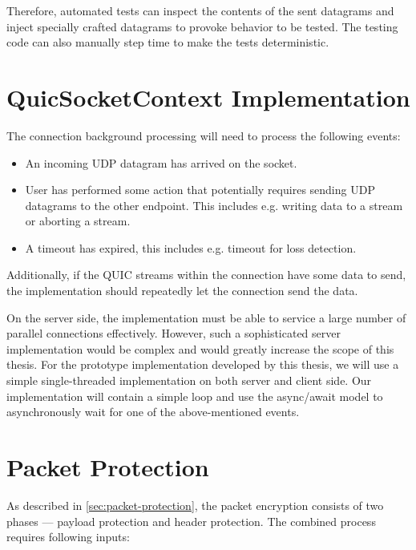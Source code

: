 Therefore, automated tests can inspect the contents of the sent datagrams and inject specially
crafted datagrams to provoke behavior to be tested. The testing code can also manually step time to
make the tests deterministic.

\section{QuicSocketContext Implementation}

The connection background processing will need to process the following events:

\begin{itemize}

  \item An incoming UDP datagram has arrived on the socket.

  \item User has performed some action that potentially requires sending UDP datagrams to the other
    endpoint. This includes e.g. writing data to a stream or aborting a stream.

  \item A timeout has expired, this includes e.g. timeout for loss detection.

\end{itemize}

Additionally, if the QUIC streams within the connection have some data to send, the
\QuicSocketContext{} implementation should repeatedly let the connection send the data.


On the server side, the implementation must be able to service a large number of parallel
connections effectively. However, such a sophisticated server implementation would be complex and
would greatly increase the scope of this thesis. For the prototype implementation developed by this
thesis, we will use a simple single-threaded implementation on both server and client side. Our
implementation will contain a simple loop and use the async/await model to asynchronously wait for
one of the above-mentioned events.

\section{Packet Protection}

As described in \autoref{sec:packet-protection}, the packet encryption consists of two phases ---
payload protection and header protection. The combined process requires following inputs:

